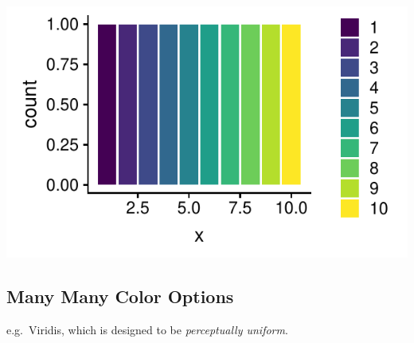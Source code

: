\documentclass[]{article}
\begin{document}
\includegraphics{design_files/figure-latex/unnamed-chunk-7-1.pdf}

\hypertarget{many-many-color-options}{%
\subsection{Many Many Color Options}\label{many-many-color-options}}

e.g.~Viridis, which is designed to be \emph{perceptually uniform}.
\end{document}
